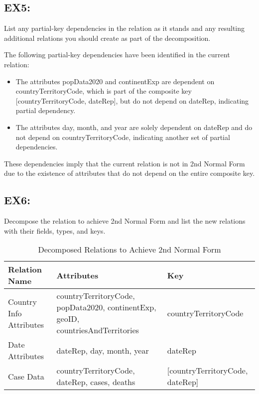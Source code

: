 \documentclass{article}
\begin{document}
\subsection{EX5:} List any partial-key dependencies in the relation as it stands and any resulting additional relations you should create as part of the decomposition.

\vspace{1mm}


The following partial-key dependencies have been identified in the current relation:

\vspace{1mm}

\begin{itemize}
  \item The attributes popData2020 and continentExp are dependent on countryTerritoryCode, which is part of the composite key [countryTerritoryCode, dateRep], but do not depend on dateRep, indicating partial dependency.
  \item The attributes day, month, and year are solely dependent on dateRep and do not depend on countryTerritoryCode, indicating another set of partial dependencies.
\end{itemize}

\vspace{1mm}

These dependencies imply that the current relation is not in 2nd Normal Form due to the existence of attributes that do not depend on the entire composite key.
\vspace{5mm}




\subsection{EX6:} Decompose the relation to achieve 2nd Normal Form and list the new relations with their fields, types, and keys.

\vspace{1mm}

\begin{table}[htbp]
\centering
\caption{Decomposed Relations to Achieve 2nd Normal Form}
\label{tab:relations}
\begin{tabular}{|p{4cm}|p{7cm}|p{4cm}|}
\hline
\textbf{Relation Name} & \textbf{Attributes} & \textbf{Key} \\ \hline
Country Info Attributes & countryTerritoryCode, popData2020, continentExp, geoID, countriesAndTerritories & countryTerritoryCode \\ \hline
Date Attributes & dateRep, day, month, year & dateRep \\ \hline
Case Data & countryTerritoryCode, dateRep, cases, deaths  & [countryTerritoryCode, dateRep] \\ \hline
\end{tabular}
\end{table}
\end{document}
